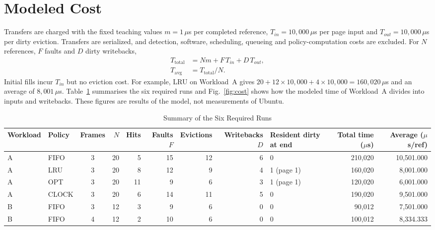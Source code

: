 \documentclass[conference,a4paper]{IEEEtran}
\begin{document}
\section{Modeled Cost}\label{sec:cost}
Transfers are charged with the fixed teaching values $m = 1\,\mu$s per completed reference, $T_{in} = 10{,}000\,\mu$s per page input and $T_{out} = 10{,}000\,\mu$s per dirty eviction. Transfers are serialized, and detection, software, scheduling, queueing and policy-computation costs are excluded. For $N$ references, $F$ faults and $D$ dirty writebacks,
\begin{align}
T_{\mathrm{total}} &= N m + F\,T_{in} + D\,T_{out}, \label{eq:cost}\\
T_{\mathrm{avg}} &= T_{\mathrm{total}} / N. \label{eq:avg}
\end{align}
Initial fills incur $T_{in}$ but no eviction cost. For example, LRU on Workload~A gives $20 + 12 \times 10{,}000 + 4 \times 10{,}000 = 160{,}020\,\mu$s and an average of $8{,}001\,\mu$s. Table~\ref{tab:summary} summarises the six required runs and Fig.~\ref{fig:cost} shows how the modeled time of Workload~A divides into inputs and writebacks. These figures are results of the model, not measurements of Ubuntu.

\begin{table}[!t]
\renewcommand{\arraystretch}{1.1}
\caption{Summary of the Six Required Runs}
\label{tab:summary}
\centering\footnotesize
\begin{tabular}{l l c r r r r r l r r}
\toprule
Workload & Policy & Frames & $N$ & Hits & Faults $F$ & Evictions & Writebacks $D$ & Resident dirty at end & Total time ($\mu$s) & Average ($\mu$s/ref) \\
\midrule
A & FIFO  & 3 & 20 & 5  & 15 & 12 & 6 & 0 & 210{,}020 & 10{,}501.000 \\
A & LRU   & 3 & 20 & 8  & 12 & 9  & 4 & 1 (page 1) & 160{,}020 & 8{,}001.000 \\
A & OPT   & 3 & 20 & 11 & 9  & 6  & 3 & 1 (page 1) & 120{,}020 & 6{,}001.000 \\
A & CLOCK & 3 & 20 & 6  & 14 & 11 & 5 & 0 & 190{,}020 & 9{,}501.000 \\
\midrule
B & FIFO  & 3 & 12 & 3  & 9  & 6  & 0 & 0 & 90{,}012  & 7{,}501.000 \\
B & FIFO  & 4 & 12 & 2  & 10 & 6  & 0 & 0 & 100{,}012 & 8{,}334.333 \\
\bottomrule
\end{tabular}
\end{table}
\end{document}
